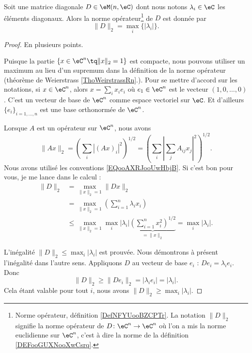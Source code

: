 \begin{lemma}        \label{LEMooCSBVooZzqxqg}
	Soit une matrice diagonale \( D\in \eM(n,\eC)\) dont nous notons \( \lambda_i\in \eC\) les éléments diagonaux. Alors la norme opérateur\footnote{Norme opérateur, définition \ref{DefNFYUooBZCPTr}. La notation \( \| D \|_2\) signifie la norme opérateur de \( D\colon \eC^n\to \eC^n\) où l'on a mis la norme euclidienne sur \( \eC^n\), c'est à dire la norme de la définition \ref{DEFooGUXNooXwCsrq}.} de \( D\) est donnée par
	\begin{equation}
		\| D \|_2=\max_i\{ | \lambda_i | \}.
	\end{equation}
\end{lemma}

\begin{proof}
	En plusieurs points.
	\begin{subproof}
		\spitem[Le compact]
		Puisque la partie \( \{ x\in \eC^n\tq \| x \|_2=1 \}\) est compacte, nous pouvons utiliser un maximum au lieu d'un supremum dans la définition de la norme opérateur (théorème de Weierstrass \ref{ThoWeirstrassRn}.).
		Pour se mettre d'accord sur les notations, si \( x\in \eC^n\), alors \( x=\sum_ix_ie_i\) où \( e_1\in \eC^n\) est le vecteur \( (1, 0,\ldots, 0)\). C'est un vecteur de base de \( \eC^n\) comme espace vectoriel sur \( \eC\). Et d'ailleurs \( \{ e_i \}_{i=1,\ldots, n}\) est une base orthonormée de \( \eC^n\).

		Lorsque \( A\) est un opérateur sur \( \eC^n\), nous avons
		\begin{equation}
			\| Ax \|_2=\left( \sum_i| (Ax)_i |^2 \right)^{1/2}
			=\left( \sum_i \left| \sum_jA_{ij}x_j \right|^2 \right)^{1/2}.
		\end{equation}
		Nous avons utilisé les conventions \eqref{EQooAXRJooUwHbjB}.
		\spitem[Le calcul]
		Si c'est bon pour vous, je me lance dans le calcul :
		\begin{subequations}
			\begin{align}
				\| D \|_2 & =\max_{\| x \|_2=1}\| Dx \|_2                                                                              \\
				          & =\max_{\| x \|_2=1}   \left( \sum_{i=1}^n\lambda_ix_i \right)                                              \\
				          & \leq \max_{\| x \|_2=1}\max_i| \lambda_i |\underbrace{\left( \sum_{i=1}^nx_i^2 \right)^{1/2}}_{=\| x \|_2}
				            =\max_i| \lambda_i |.
			\end{align}
		\end{subequations}
	\end{subproof}
	L'inégalité \( \| D \|_2\leq \max_i| \lambda_i |\) est prouvée. Nous démontrons à présent l'inégalité dans l'autre sens. Appliquons \( D\) au vecteur de base \( e_i\) : \( De_i=\lambda_ie_i\). Donc
	\begin{equation}
		\| D \|_2\geq \| De_i \|_2=| \lambda_ie_i |=| \lambda_i |.
	\end{equation}
	Cela étant valable pour tout \( i\), nous avons \( \| D \|_2\geq\max_i| \lambda_i |\).
\end{proof}

